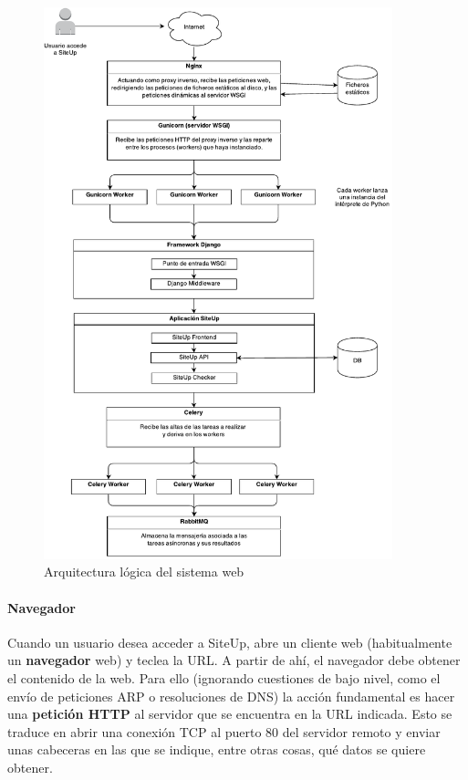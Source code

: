 \begin{figure}[htbp]
  \centering
  \includegraphics[width=0.9\textwidth]{5_diseno/diagrama_arquitectura_logica}
  \caption{Arquitectura lógica del sistema web}
  \label{fig:arquitectura-logica}
\end{figure}


\paragraph{Navegador}

Cuando un usuario desea acceder a SiteUp, abre un cliente web (habitualmente un
\textbf{navegador} web) y teclea la \ac{URL}. A partir de ahí, el navegador debe
obtener el contenido de la web. Para ello (ignorando cuestiones de bajo nivel,
como el envío de peticiones ARP o resoluciones de DNS) la acción fundamental es
hacer una \textbf{petición HTTP} al servidor que se encuentra en la URL
indicada. Esto se traduce en abrir una conexión TCP al puerto 80 del servidor
remoto y enviar unas cabeceras en las que se indique, entre otras cosas, qué
datos se quiere obtener.

